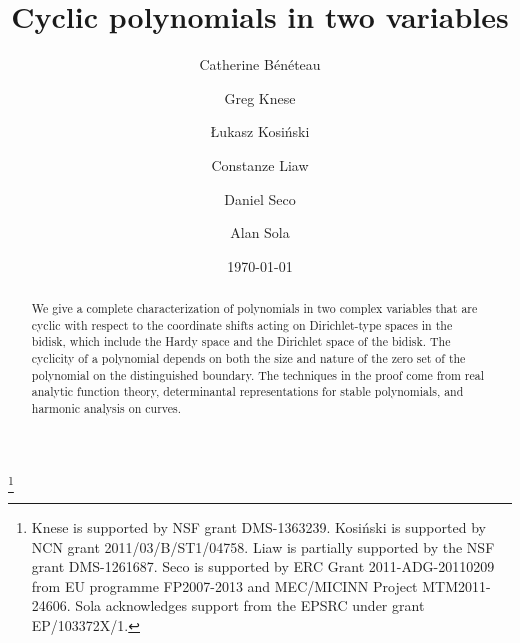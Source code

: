 \documentclass[11 pt,reqno]{amsart}
\theoremstyle{definition}
\theoremstyle{remark}
\numberwithin{equation}{section} \numberwithin{figure}{section}
\begin{document}


\title[Cyclic polynomials in two variables]{Cyclic polynomials in two variables}
\author[B\'en\'eteau]{Catherine B\'en\'eteau}
\address{Department of Mathematics, University of South Florida, 4202 E. Fowler Avenue, Tampa, FL 33620-5700, USA.}
\author[Knese]{Greg Knese}
\address{Washington University in St. Louis, Department of Mathematics, One Brookings Drive, Campus Box 1146, St. Louis, MO 63130-4899, USA.}
\author[Kosi\'nski]{\L ukasz Kosi\'nski}

\address{Institute of Mathematics, Jagiellonian University, \L
  ojasiewicza 6, 30-348 Krak\'ow, Poland.}
 \author[Liaw]{Constanze Liaw}
\address{Department of Mathematics, Baylor University, One Bear Place
  \#97328, Waco, TX 76798-7328, USA.}
\author[Seco]{Daniel Seco} \address{Mathematics Institute, Zeeman
  Building, University of Warwick, Coventry CV4 7AL, UK.}
 \author[Sola]{Alan Sola} \address{Centre
  for Mathematical Sciences, University of Cambridge, Wilberforce
  Road, Cambridge CB3 0WB, UK.}  
\thanks{Knese is supported by NSF grant DMS-1363239. Kosi\'nski is
  supported by NCN grant 2011/03/B/ST1/04758. Liaw is partially
  supported by the NSF grant DMS-1261687. Seco is supported by ERC
  Grant 2011-ADG-20110209 from EU programme FP2007-2013 and MEC/MICINN
  Project MTM2011-24606.  Sola acknowledges support from the EPSRC
  under grant EP/103372X/1. } \date{\today}

\begin{abstract}
  We give a complete characterization of polynomials in two complex
  variables that are cyclic with respect to the coordinate shifts
  acting on Dirichlet-type spaces in the bidisk, which include the
  Hardy space and the Dirichlet space of the bidisk.  The cyclicity of
  a polynomial depends on both the size and nature of the zero set of
  the polynomial on the distinguished boundary.  The techniques in the
  proof come from real analytic function theory, determinantal
  representations for stable polynomials, and harmonic analysis on
  curves.
\end{abstract}

\maketitle
\tableofcontents
\end{document}
